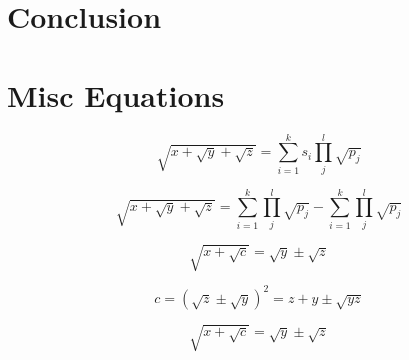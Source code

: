 \documentclass[12pt, letterpaper]{article}
\begin{document}
\section{Conclusion}

\section{Misc Equations}

\begin{equation}
\sqrt{x + \sqrt{y} + \sqrt{z}} = \sum_{i=1}^{k} s_{i}  \prod_{j}^{l} \sqrt{p_{j}}
\end{equation}

\begin{equation}
\sqrt{x + \sqrt{y} + \sqrt{z}} = \sum_{i=1}^{k}  \prod_{j}^{l} \sqrt{p_{j}} -  \sum_{i=1}^{k}  \prod_{j}^{l} \sqrt{p_{j}}
\end{equation}

\begin{equation}
\sqrt{x + \sqrt{c}} = \sqrt{y} \pm \sqrt{z} 
\end{equation}

\begin{equation}
c = (\sqrt{z} \pm \sqrt{y} )^{2} = z + y \pm \sqrt{yz}
\end{equation}

\begin{equation}
\sqrt{x + \sqrt{c}} = \sqrt{y} \pm \sqrt{z} 
\end{equation}
\end{document}
